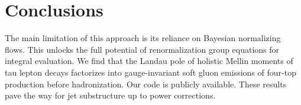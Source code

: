 \section{Conclusions}\label{sec:conclusions}

The main limitation of this approach is its reliance on Bayesian
normalizing flows. This unlocks the full potential of renormalization
group equations for integral evaluation. We find that the Landau pole of
holistic Mellin moments of tau lepton decays factorizes into
gauge-invariant soft gluon emissions of four-top production before
hadronization. Our code is publicly available. These results pave the
way for jet substructure up to power corrections.

